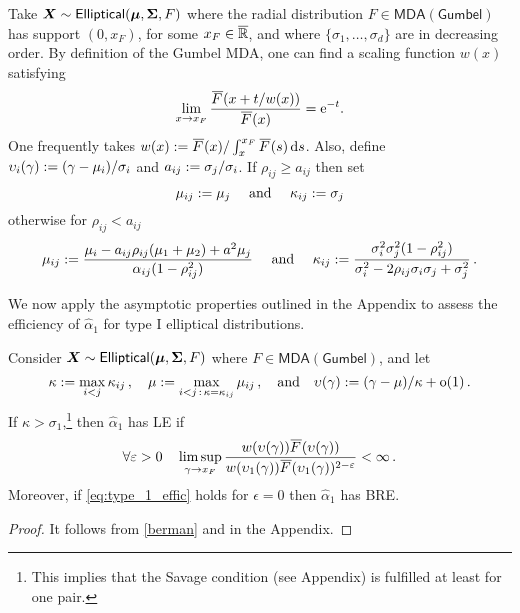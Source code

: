 Take $\bm{X} \sim \mathsf{Elliptical}(\bm{\mu}, \bm{\Sigma}, F)$ where the radial distribution $F \in \mathsf{MDA(Gumbel)}$ has support $(0,x_F)$, for some $x_F \in \overline{\mathbb{R}}$, and where $\{\sigma_1, \dots, \sigma_d\}$ are in decreasing order. By definition of the Gumbel MDA, one can find a scaling function $w(x)$ satisfying
\begin{equation*}
  \lim_{x\to x_F} \frac{\Ftail(x+t/w(x))}{\Ftail(x)}=\e^{-t}.
\end{equation*}
One frequently takes $w(x)\defeq \Ftail(x) / \int_{x}^{x_F}\Ftail(s) \dd s$.
Also, define $\upsilon_i(\gamma) := (\gamma - \mu_i)/\sigma_i$ and $a_{ij} := \sigma_j/\sigma_i$. If $\rho_{ij} \ge a_{ij}$ then set
 \[ \mu_{ij} := \mu_j \quad \text{ and } \quad \kappa_{ij} := \sigma_j \]
 otherwise for $\rho_{ij} < a_{ij}$
 \[ \mu_{ij} := \frac{\mu_i-a_{ij}\rho_{ij}(\mu_1+\mu_2)+a^2\mu_j}{\alpha_{ij}(1-\rho^2_{ij})} \quad \text{ and } \quad \kappa_{ij} := \frac{\sigma_i^2\sigma_j^2(1-\rho^2_{ij})}{ {\sigma_i^2-2\rho_{ij}\sigma_i\sigma_j + \sigma_{j}^2}} \,. \]

We now apply the asymptotic properties outlined in the
Appendix to assess the efficiency of $\hat{\alpha}_1$ for type I elliptical distributions.

\begin{theorem} \label{thm:ellip_efficiency}
Consider $\bm{X} \sim \mathsf{Elliptical}(\bm{\mu}, \bm{\Sigma}, F)$ where $F \in \mathsf{MDA(Gumbel)}$, and let
 \[ \kappa := \max_{i<j} \kappa_{ij} \,, \quad \mu := \max_{i<j \,:\, \kappa = \kappa_{ij}} \mu_{ij} \,, \quad \text{and} \quad  \upsilon(\gamma) := (\gamma-\mu)/\kappa + {\mathrm{o}}(1) \,. \]
 If $\kappa>\sigma_1$,\footnote{This implies that the Savage condition (see Appendix) is fulfilled at least for one pair.} then $\hat{\alpha}_1$ has LE if
 \begin{equation} \label{eq:type_1_effic}
 	\forall \epsilon>0 \quad
   \limsup_{\gamma\to x_F}\frac{w(\upsilon(\gamma))\Ftail(\upsilon(\gamma))}
   {w(\upsilon_1(\gamma))\Ftail(\upsilon_1(\gamma))^{2-\epsilon}}<\infty \,.
 \end{equation}
 Moreover, if \eqref{eq:type_1_effic} holds for $\epsilon=0$ then $\hat{\alpha}_1$ has BRE.
\end{theorem}

\begin{proof}
 It follows from \eqref{berman} and  in the Appendix.
\end{proof}

